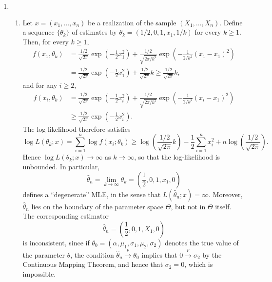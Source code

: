 \documentclass[12pt]{article}
\begin{document}
\begin{enumerate}
\item
\begin{enumerate}[label=(\roman*)]
\item
Let $x = (x_1, \ldots, x_n)$ be a realization of the sample $(X_1, \ldots, X_n)$. Define a sequence $\{\theta_k\}$ of estimates by $\theta_k = (1/2, 0, 1, x_1, 1/k)$ for every $k \geq 1$. Then, for every $k \geq 1$,
\begin{align*}
f(x_1, \theta_k) &= \frac{1/2}{\sqrt{2\pi}} \exp\left(-\frac{1}{2}x_1^2 \right) + \frac{1/2}{\sqrt{2\pi/k^2}} \exp\left(-\frac{1}{2/k^2}(x_1 - x_1)^2 \right) \\
&= \frac{1/2}{\sqrt{2\pi}} \exp\left(-\frac{1}{2}x_1^2 \right) + \frac{1/2}{\sqrt{2\pi}}k \geq \frac{1/2}{\sqrt{2\pi}}k,
\end{align*}
and for any $i \geq 2$,
\begin{align*}
f(x_i, \theta_k) &= \frac{1/2}{\sqrt{2\pi}} \exp\left(-\frac{1}{2}x_i^2 \right) + \frac{1/2}{\sqrt{2\pi/k^2}} \exp\left(-\frac{1}{2/k^2}(x_i - x_1)^2 \right) \\
&\geq \frac{1/2}{\sqrt{2\pi}} \exp\left(-\frac{1}{2}x_i^2 \right).
\end{align*}
The log-likelihood therefore satisfies
\begin{equation*}
\log L(\theta_k; x) = \sum_{i=1}^n \log f(x_i; \theta_k) \geq \log\left(\frac{1/2}{\sqrt{2\pi}}k\right) - \frac{1}{2} \sum_{i=1}^n x_i^2 + n\log\left(\frac{1/2}{\sqrt{2\pi}}\right).
\end{equation*}
Hence $\log L(\theta_k; x) \to \infty$ as $k \to \infty$, so that the log-likelihood is unbounded. In particular,
\begin{equation*}
\hat{\theta}_n = \lim_{k \to \infty} \theta_k = \left(\frac{1}{2}, 0, 1, x_1, 0\right)
\end{equation*}
defines a ``degenerate'' MLE, in the sense that $L(\hat{\theta}_n; x) = \infty$. Moreover, $\hat{\theta}_n$ lies on the boundary of the parameter space $\Theta$, but not in $\Theta$ itself. The corresponding estimator
\begin{equation*}
\hat{\theta}_n = \left(\frac{1}{2}, 0, 1, X_1, 0\right)
\end{equation*}
is inconsistent, since if $\theta_0 = (\alpha, \mu_1, \sigma_1, \mu_2, \sigma_2)$ denotes the true value of the parameter $\theta$, the condition $\hat{\theta}_n \overset{p}\to \theta_0$ implies that $0 \overset{p}\to \sigma_2$ by the Continuous Mapping Theorem, and hence that $\sigma_2 = 0$, which is impossible.


\end{enumerate}
\end{enumerate}
\end{document}
